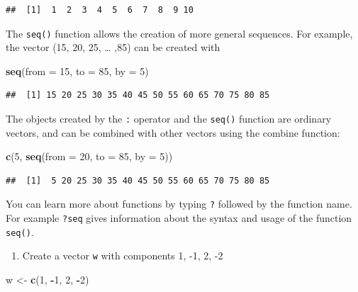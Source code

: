 \documentclass[
]{book}
\newenvironment{Shaded}{\begin{snugshade}}{\end{snugshade}}
\newcommand{\AttributeTok}[1]{\textcolor[rgb]{0.13,0.29,0.53}{#1}}
\newcommand{\DecValTok}[1]{\textcolor[rgb]{0.00,0.00,0.81}{#1}}
\newcommand{\FunctionTok}[1]{\textcolor[rgb]{0.13,0.29,0.53}{\textbf{#1}}}
\newcommand{\NormalTok}[1]{#1}
\newcommand{\OtherTok}[1]{\textcolor[rgb]{0.56,0.35,0.01}{#1}}
\newcommand{\SpecialCharTok}[1]{\textcolor[rgb]{0.81,0.36,0.00}{\textbf{#1}}}
\providecommand{\tightlist}{%
  \setlength{\itemsep}{0pt}\setlength{\parskip}{0pt}}
\theoremstyle{definition}
\theoremstyle{definition}
\theoremstyle{definition}
\theoremstyle{definition}
\theoremstyle{remark}
\begin{document}
\begin{verbatim}
##  [1]  1  2  3  4  5  6  7  8  9 10
\end{verbatim}

The \texttt{seq()} function allows the creation of more general
sequences. For example, the vector (15, 20, 25, \ldots{} ,85) can be created
with

\begin{Shaded}
\begin{Highlighting}[]
\FunctionTok{seq}\NormalTok{(}\AttributeTok{from =} \DecValTok{15}\NormalTok{, }\AttributeTok{to =} \DecValTok{85}\NormalTok{, }\AttributeTok{by =} \DecValTok{5}\NormalTok{)}
\end{Highlighting}
\end{Shaded}

\begin{verbatim}
##  [1] 15 20 25 30 35 40 45 50 55 60 65 70 75 80 85
\end{verbatim}

The objects created by the \texttt{:} operator and the \texttt{seq()} function
are ordinary vectors, and can be combined with other vectors using the
combine function:

\begin{Shaded}
\begin{Highlighting}[]
\FunctionTok{c}\NormalTok{(}\DecValTok{5}\NormalTok{, }\FunctionTok{seq}\NormalTok{(}\AttributeTok{from =} \DecValTok{20}\NormalTok{, }\AttributeTok{to =} \DecValTok{85}\NormalTok{, }\AttributeTok{by =} \DecValTok{5}\NormalTok{))}
\end{Highlighting}
\end{Shaded}

\begin{verbatim}
##  [1]  5 20 25 30 35 40 45 50 55 60 65 70 75 80 85
\end{verbatim}

You can learn more about functions by typing \texttt{?} followed by the
function name. For example \texttt{?seq} gives information about the
syntax and usage of the function \texttt{seq()}.

\begin{enumerate}
\def\labelenumi{\arabic{enumi}.}
\tightlist
\item
  Create a vector \texttt{w} with components 1, -1, 2, -2
\end{enumerate}

\begin{Shaded}
\begin{Highlighting}[]
\NormalTok{w }\OtherTok{\textless{}{-}} \FunctionTok{c}\NormalTok{(}\DecValTok{1}\NormalTok{, }\SpecialCharTok{{-}}\DecValTok{1}\NormalTok{, }\DecValTok{2}\NormalTok{, }\SpecialCharTok{{-}}\DecValTok{2}\NormalTok{)}
\end{Highlighting}
\end{Shaded}
\end{document}
